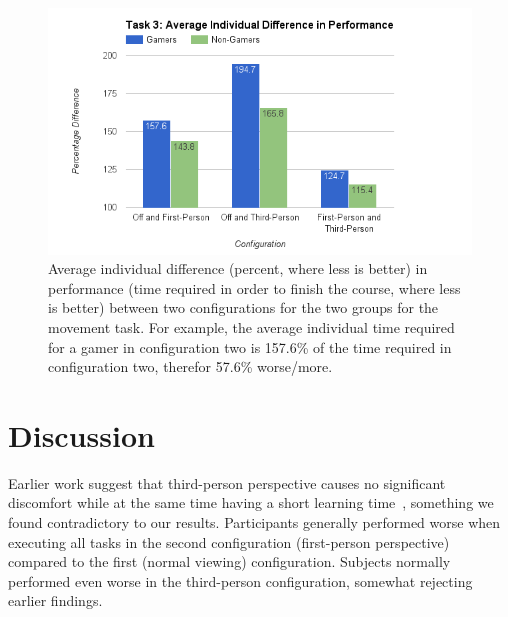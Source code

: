 \documentclass[runningheads,a4paper,oribibl]{llncs}
\begin{document}
\begin{figure}
   \centering
   \includegraphics[width=\textwidth]{ExternalMaterial/Task3GraphD}
   \caption{Average individual difference (percent, where less is better) in performance (time required in order to finish the course, where less is better) between two configurations for the two groups for the movement task. For example, the average individual time required for a gamer in configuration two is 157.6\% of the time required in configuration two, therefor 57.6\% worse/more.} \label{fig:Task3GraphD}
\end{figure}
























\section{Discussion} \label{sec:Discussion}
Earlier work suggest that third-person perspective causes no significant discomfort while at the same time having a short learning time~\cite{nakamura20103pi}, something we found contradictory to our results. Participants generally performed worse when executing all tasks in the second configuration (first-person perspective) compared to the first (normal viewing) configuration. Subjects normally performed even worse in the third-person configuration, somewhat rejecting earlier findings. 
\end{document}
